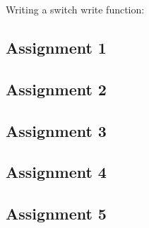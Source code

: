 \documentclass[
	letterpaper, %
	10pt, %
]{CSUniSchoolLabReport}
\begin{document}
   

\item Writing a switch write function:

 


\subsection{Assignment 1}

\subsection{Assignment 2}

\subsection{Assignment 3}

\subsection{Assignment 4}

\subsection{Assignment 5}
\end{document}
